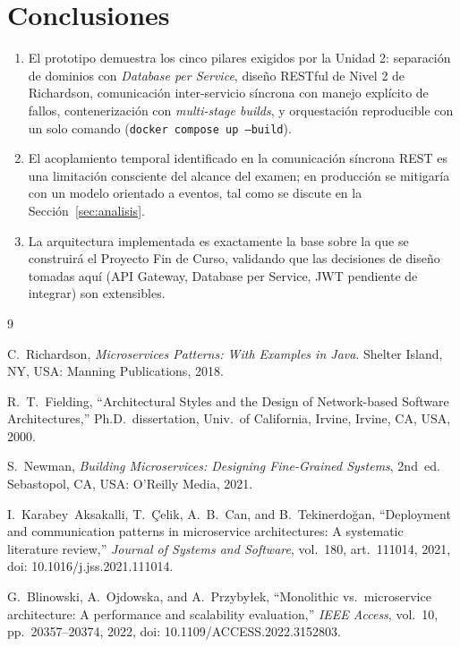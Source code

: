 \documentclass[11pt,a4paper]{article}
\begin{document}
\section{Conclusiones}

\begin{enumerate}[leftmargin=2em]
    \item El prototipo demuestra los cinco pilares exigidos por la Unidad 2:
    separación de dominios con \emph{Database per Service}, diseño RESTful de
    Nivel 2 de Richardson, comunicación inter-servicio síncrona con manejo
    explícito de fallos, contenerización con \emph{multi-stage builds}, y
    orquestación reproducible con un solo comando (\texttt{docker compose up
    --build}).
    \item El acoplamiento temporal identificado en la comunicación síncrona
    REST es una limitación consciente del alcance del examen; en producción
    se mitigaría con un modelo orientado a eventos, tal como se discute en la
    Sección~\ref{sec:analisis}.
    \item La arquitectura implementada es exactamente la base sobre la que se
    construirá el Proyecto Fin de Curso, validando que las decisiones de
    diseño tomadas aquí (API Gateway, Database per Service, JWT pendiente de
    integrar) son extensibles.
\end{enumerate}

\begin{thebibliography}{9}

C.~Richardson, \emph{Microservices Patterns: With Examples in Java}.
Shelter Island, NY, USA: Manning Publications, 2018.

R.~T.~Fielding, ``Architectural Styles and the Design of Network-based
Software Architectures,'' Ph.D.\ dissertation, Univ.\ of California, Irvine,
Irvine, CA, USA, 2000.

S.~Newman, \emph{Building Microservices: Designing Fine-Grained Systems},
2nd~ed. Sebastopol, CA, USA: O'Reilly Media, 2021.

I.~Karabey~Aksakalli, T.~Çelik, A.~B.~Can, and B.~Tekinerdoğan,
``Deployment and communication patterns in microservice architectures: A
systematic literature review,'' \emph{Journal of Systems and Software},
vol.~180, art.~111014, 2021, doi: 10.1016/j.jss.2021.111014.

G.~Blinowski, A.~Ojdowska, and A.~Przybyłek, ``Monolithic vs.\ microservice
architecture: A performance and scalability evaluation,'' \emph{IEEE Access},
vol.~10, pp.~20357--20374, 2022, doi: 10.1109/ACCESS.2022.3152803.

\end{thebibliography}
\end{document}

